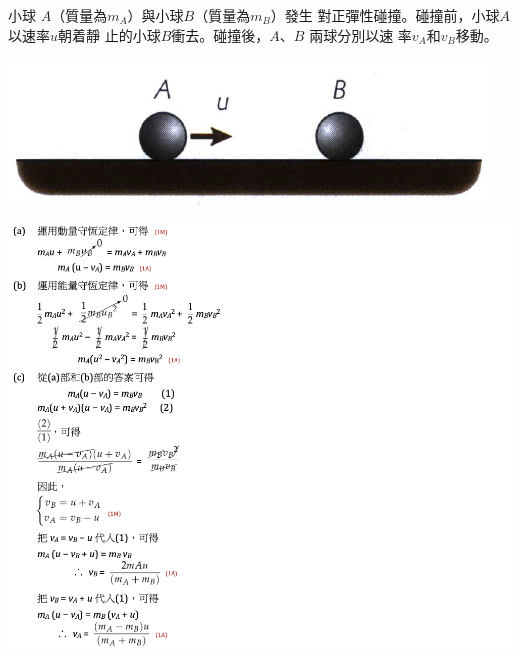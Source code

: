 {
    小球 $A$（質量為$m_A$）與小球$B$（質量為$m_B$）發生 對正彈性碰撞。碰撞前，小球$A$以速率$u$朝着靜 止的小球$B$衝去。碰撞後，$A$、$B$ 兩球分別以速 率$v_A$和$v_B$移動。\bigskip \par{\par\centering\includegraphics[width=.3\textwidth]{./img/ch5_momentum_lq_2024-05-11-21-04-47.png}\par}\bigskip
    \clearpage{}
}{
    \sol
    \par{\par\centering\includegraphics[width=\textwidth]{./img/ch5_momentum_lq_2024-05-11-22-45-13.png}\par}
}



